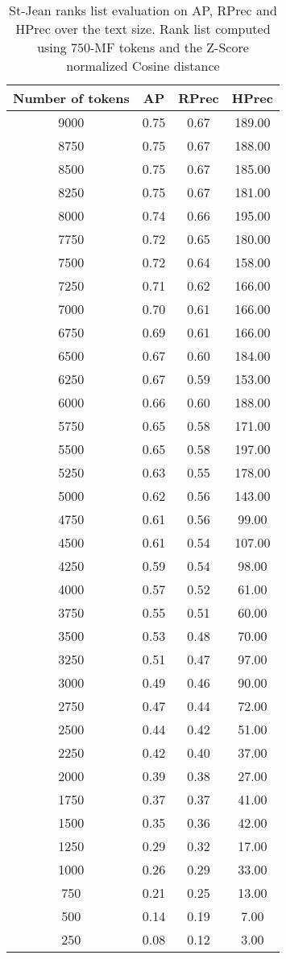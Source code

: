 \begin{table}
  \caption{St-Jean ranks list evaluation on AP, RPrec and HPrec over the text size. Rank list computed using $750$-MF tokens and the Z-Score normalized Cosine distance}
  \label{tab:degradation}

  \begin{tabular}{c|c c c}
    \toprule
    Number of tokens & AP & RPrec & HPrec \\
    \midrule
    9000 & 0.75 & 0.67 & 189.00 \\
    8750 & 0.75 & 0.67 & 188.00 \\
    8500 & 0.75 & 0.67 & 185.00 \\
    8250 & 0.75 & 0.67 & 181.00 \\
    8000 & 0.74 & 0.66 & 195.00 \\
    7750 & 0.72 & 0.65 & 180.00 \\
    7500 & 0.72 & 0.64 & 158.00 \\
    7250 & 0.71 & 0.62 & 166.00 \\
    7000 & 0.70 & 0.61 & 166.00 \\
    6750 & 0.69 & 0.61 & 166.00 \\
    6500 & 0.67 & 0.60 & 184.00 \\
    6250 & 0.67 & 0.59 & 153.00 \\
    6000 & 0.66 & 0.60 & 188.00 \\
    5750 & 0.65 & 0.58 & 171.00 \\
    5500 & 0.65 & 0.58 & 197.00 \\
    5250 & 0.63 & 0.55 & 178.00 \\
    5000 & 0.62 & 0.56 & 143.00 \\
    4750 & 0.61 & 0.56 &  99.00 \\
    4500 & 0.61 & 0.54 & 107.00 \\
    4250 & 0.59 & 0.54 &  98.00 \\
    4000 & 0.57 & 0.52 &  61.00 \\
    3750 & 0.55 & 0.51 &  60.00 \\
    3500 & 0.53 & 0.48 &  70.00 \\
    3250 & 0.51 & 0.47 &  97.00 \\
    3000 & 0.49 & 0.46 &  90.00 \\
    2750 & 0.47 & 0.44 &  72.00 \\
    2500 & 0.44 & 0.42 &  51.00 \\
    2250 & 0.42 & 0.40 &  37.00 \\
    2000 & 0.39 & 0.38 &  27.00 \\
    1750 & 0.37 & 0.37 &  41.00 \\
    1500 & 0.35 & 0.36 &  42.00 \\
    1250 & 0.29 & 0.32 &  17.00 \\
    1000 & 0.26 & 0.29 &  33.00 \\
    750 & 0.21 & 0.25 &  13.00 \\
    500 & 0.14 & 0.19 &   7.00 \\
    250 & 0.08 & 0.12 &   3.00 \\
    \bottomrule
  \end{tabular}
\end{table}

